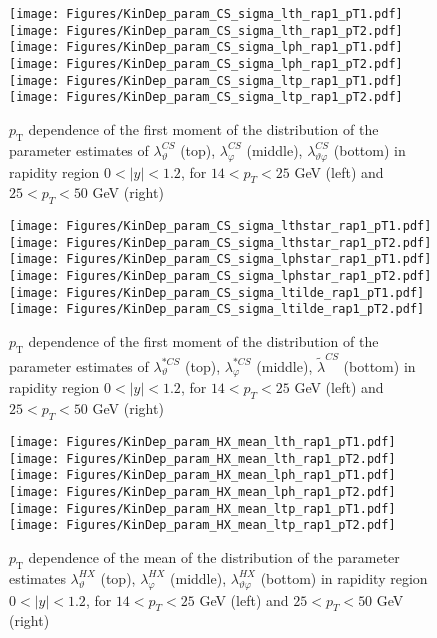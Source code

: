 \documentclass[12pt]{article}
\newcommand{\pT}{p_\mathrm{T}}
\newcommand{\absy}{\left |  y \right |}
\newcommand{\lamthCS}{\lambda^{\scriptscriptstyle CS}_\vartheta}
\newcommand{\lamphCS}{\lambda^{\scriptscriptstyle CS}_\varphi}
\newcommand{\lamthphCS}{\lambda^{\scriptscriptstyle CS}_{\vartheta \varphi}}
\newcommand{\lamtildeCS}{\tilde{\lambda}^{\scriptscriptstyle CS}}
\newcommand{\lamthstarCS}{\lambda^{* \scriptscriptstyle CS}_\vartheta}
\newcommand{\lamphstarCS}{\lambda^{* \scriptscriptstyle CS}_\varphi}
\newcommand{\lamthHX}{\lambda^{\scriptscriptstyle HX}_\vartheta}
\newcommand{\lamphHX}{\lambda^{\scriptscriptstyle HX}_\varphi}
\newcommand{\lamthphHX}{\lambda^{\scriptscriptstyle HX}_{\vartheta \varphi}}
\begin{document}
\begin{figure}[htbp]
\centering
\texttt{[image: Figures/KinDep\_param\_CS\_sigma\_lth\_rap1\_pT1.pdf]}
\texttt{[image: Figures/KinDep\_param\_CS\_sigma\_lth\_rap1\_pT2.pdf]}
\texttt{[image: Figures/KinDep\_param\_CS\_sigma\_lph\_rap1\_pT1.pdf]}
\texttt{[image: Figures/KinDep\_param\_CS\_sigma\_lph\_rap1\_pT2.pdf]}
\texttt{[image: Figures/KinDep\_param\_CS\_sigma\_ltp\_rap1\_pT1.pdf]}
\texttt{[image: Figures/KinDep\_param\_CS\_sigma\_ltp\_rap1\_pT2.pdf]}
\caption{$\pT$ dependence of the first moment of the distribution of the parameter estimates of $\lamthCS$ (top), $\lamphCS$ (middle), $\lamthphCS$ (bottom) in rapidity region $0<\absy<1.2$, for $14 < p_T < 25$ GeV (left) and
$25 < p_T < 50$ GeV (right)}
\end{figure}
\clearpage

\begin{figure}[htbp]
\centering
\texttt{[image: Figures/KinDep\_param\_CS\_sigma\_lthstar\_rap1\_pT1.pdf]}
\texttt{[image: Figures/KinDep\_param\_CS\_sigma\_lthstar\_rap1\_pT2.pdf]}
\texttt{[image: Figures/KinDep\_param\_CS\_sigma\_lphstar\_rap1\_pT1.pdf]}
\texttt{[image: Figures/KinDep\_param\_CS\_sigma\_lphstar\_rap1\_pT2.pdf]}
\texttt{[image: Figures/KinDep\_param\_CS\_sigma\_ltilde\_rap1\_pT1.pdf]}
\texttt{[image: Figures/KinDep\_param\_CS\_sigma\_ltilde\_rap1\_pT2.pdf]}
\caption{$\pT$ dependence of the first moment of the distribution of the parameter estimates of $\lamthstarCS$ (top), $\lamphstarCS$ (middle), $\lamtildeCS$ (bottom) in rapidity region $0<\absy<1.2$, for $14 < p_T < 25$ GeV (left) and
$25 < p_T < 50$ GeV (right)}
\end{figure}
\clearpage









\begin{figure}[htbp]
\centering
\texttt{[image: Figures/KinDep\_param\_HX\_mean\_lth\_rap1\_pT1.pdf]}
\texttt{[image: Figures/KinDep\_param\_HX\_mean\_lth\_rap1\_pT2.pdf]}
\texttt{[image: Figures/KinDep\_param\_HX\_mean\_lph\_rap1\_pT1.pdf]}
\texttt{[image: Figures/KinDep\_param\_HX\_mean\_lph\_rap1\_pT2.pdf]}
\texttt{[image: Figures/KinDep\_param\_HX\_mean\_ltp\_rap1\_pT1.pdf]}
\texttt{[image: Figures/KinDep\_param\_HX\_mean\_ltp\_rap1\_pT2.pdf]}
\caption{$\pT$ dependence of the mean of the distribution of the parameter estimates $\lamthHX$ (top), $\lamphHX$ (middle), $\lamthphHX$ (bottom) in rapidity region $0<\absy<1.2$, for $14 < p_T < 25$ GeV (left) and
$25 < p_T < 50$ GeV (right)}
\end{figure}
\clearpage
\end{document}
